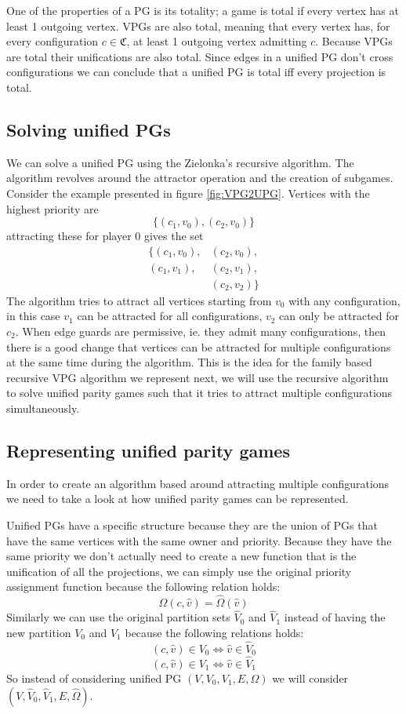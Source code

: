 One of the properties of a PG is its totality; a game is total if every vertex has at least 1 outgoing vertex. VPGs are also total, meaning that every vertex has, for every configuration $c \in \mathfrak{C}$, at least 1 outgoing vertex admitting $c$. Because VPGs are total their unifications are also total. Since edges in a unified PG don't cross configurations we can conclude that a unified PG is total iff every projection is total.

\subsection{Solving unified PGs}
We can solve a unified PG using the Zielonka's recursive algorithm. The algorithm revolves around the attractor operation and the creation of subgames. Consider the example presented in figure \ref{fig:VPG2UPG}. Vertices with the highest priority are 
\[ \{(c_1,v_0),(c_2,v_0)\}\]
attracting these for player $0$ gives the set 
\begin{align*}
\{(c_1,v_0),&(c_2,v_0),\\
(c_1,v_1),&(c_2,v_1),\\
 &(c_2,v_2)\}
\end{align*}
The algorithm tries to attract all vertices starting from $v_0$ with any configuration, in this case $v_1$ can be attracted for all configurations, $v_2$ can only be attracted for $c_2$. When edge guards are permissive, ie. they admit many configurations, then there is a good change that vertices can be attracted for multiple configurations at the same time during the algorithm. This is the idea for the family based recursive VPG algorithm we represent next, we will use the recursive algorithm to solve unified parity games such that it tries to attract multiple configurations simultaneously.

\subsection{Representing unified parity games}
In order to create an algorithm based around attracting multiple configurations we need to take a look at how unified parity games can be represented.


Unified PGs have a specific structure because they are the union of PGs that have the same vertices with the same owner and priority. Because they have the same priority we don't actually need to create a new function that is the unification of all the projections, we can simply use the original priority assignment function because the following relation holds:
\[ \Omega(c,\hat{v}) = \hat{\Omega}(\hat{v}) \]
Similarly we can use the original partition sets $\hat{V}_0$ and $\hat{V}_1$ instead of having the new partition $V_0$ and $V_1$ because the following relations holds:
\[ (c,\hat{v}) \in V_0 \iff \hat{v}\in \hat{V}_0 \]
\[ (c,\hat{v}) \in V_1 \iff \hat{v}\in \hat{V}_1 \]
So instead of considering unified PG $(V,V_0,V_1,E,\Omega)$ we will consider $(V,\hat{V}_0,\hat{V}_1,E,\hat{\Omega})$. 

